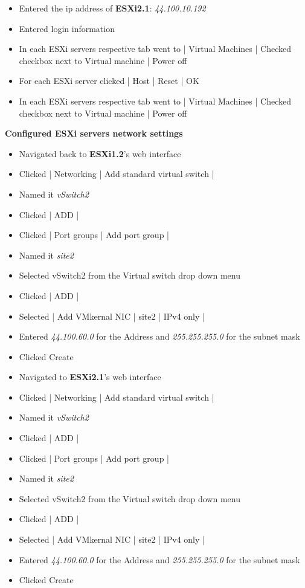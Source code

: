 \documentclass[letterpaper]{article}
\begin{document}
\begin{enumerate}
\begin{itemize}
\begin{itemize}
\item Entered the ip address of \textbf{ESXi2.1}: \emph{44.100.10.192}
\item Entered login information
\item In each ESXi servers respective tab went to | Virtual Machines | Checked checkbox next to Virtual machine | Power off
\item For each ESXi server clicked | Host | Reset | OK
\item In each ESXi servers respective tab went to | Virtual Machines | Checked checkbox next to Virtual machine | Power off
\end{itemize}
\textbf{Configured ESXi servers network settings}
\begin{itemize}
\item Navigated back to \textbf{ESXi1.2}'s web interface
\item Clicked | Networking | Add standard virtual switch |
\item Named it \emph{vSwitch2}
\item Clicked | ADD |
\item Clicked | Port groups | Add port group |
\item Named it \emph{site2}
\item Selected vSwitch2 from the Virtual switch drop down menu
\item Clicked | ADD |
\item Selected | Add VMkernal NIC | site2 | IPv4 only |
\item Entered \emph{44.100.60.0} for the Address and \emph{255.255.255.0} for the subnet mask
\item Clicked Create
\item Navigated to \textbf{ESXi2.1}'s web interface
\item Clicked | Networking | Add standard virtual switch |
\item Named it \emph{vSwitch2}
\item Clicked | ADD |
\item Clicked | Port groups | Add port group |
\item Named it \emph{site2}
\item Selected vSwitch2 from the Virtual switch drop down menu
\item Clicked | ADD |
\item Selected | Add VMkernal NIC | site2 | IPv4 only |
\item Entered \emph{44.100.60.0} for the Address and \emph{255.255.255.0} for the subnet mask
\item Clicked Create

\end{itemize}
\end{itemize}
\end{enumerate}
\end{document}
